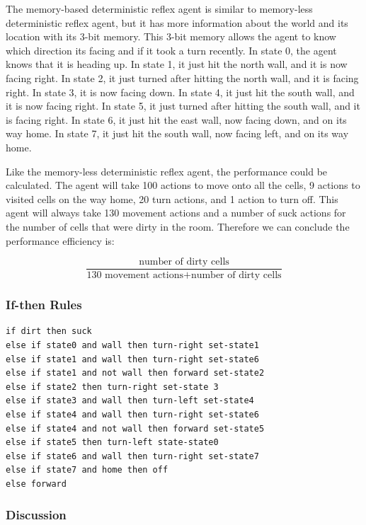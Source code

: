 \documentclass[a4paper,10pt]{article}
\begin{document}
The memory-based deterministic reflex agent is similar to memory-less deterministic reflex agent, but it has more information about the world and its location with its 3-bit memory. 
This 3-bit memory allows the agent to know which direction its facing and if it took a turn recently.
In state 0, the agent knows that it is heading up.
In state 1, it just hit the north wall, and it is now facing right.
In state 2, it just turned after hitting the north wall, and it is facing right.
In state 3, it is now facing down. 
In state 4, it just hit the south wall, and it is now facing right.
In state 5, it just turned after hitting the south wall, and it is facing right.
In state 6, it just hit the east wall, now facing down, and on its way home.
In state 7, it just hit the south wall, now facing left, and on its way home.

Like the memory-less deterministic reflex agent, the performance could be calculated.
The agent will take 100 actions to move onto all the cells, 9 actions to visited cells on the way home, 20 turn actions, and 1 action to turn off. 
This agent will always take 130 movement actions and a number of suck actions for the number of cells that were dirty in the room. 
Therefore we can conclude the performance efficiency is:

\[\frac{\mbox{number of dirty cells}}{\mbox{130 movement actions} + \mbox{number of dirty cells}}\] 

\subsubsection{If-then Rules}
\begin{verbatim}
if dirt then suck
else if state0 and wall then turn-right set-state1
else if state1 and wall then turn-right set-state6
else if state1 and not wall then forward set-state2
else if state2 then turn-right set-state 3
else if state3 and wall then turn-left set-state4
else if state4 and wall then turn-right set-state6
else if state4 and not wall then forward set-state5
else if state5 then turn-left state-state0
else if state6 and wall then turn-right set-state7
else if state7 and home then off
else forward
\end{verbatim}

\subsubsection{Discussion}
\end{document}
